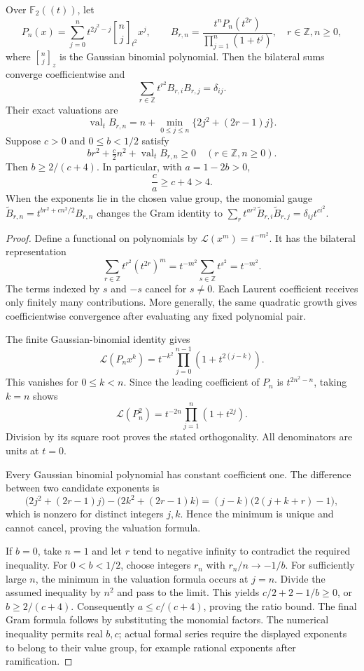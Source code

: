 \begin{proposition}\label{prop:bilateral-kernel}
Over $\mathbb F_2((t))$, let
\[
 P_n(x)=\sum_{j=0}^n t^{2j^2-j}\genfrac{[}{]}{0pt}{}{n}{j}_{t^2}x^j,
 \qquad
 B_{r,n}=\frac{t^nP_n(t^{2r})}{\prod_{j=1}^n(1+t^j)},
 \quad r\in\mathbb Z, n\geq0,
\]
where $\genfrac{[}{]}{0pt}{}{n}{j}_z$ is the Gaussian binomial polynomial. Then the bilateral sums converge coefficientwise and
\[
 \sum_{r\in\mathbb Z}t^{r^2}B_{r,i}B_{r,j}=\delta_{ij}.
\]
Their exact valuations are
\[
 \operatorname{val}_t B_{r,n}
 =n+\min_{0\leq j\leq n}\{2j^2+(2r-1)j\}.
\]
Suppose $c>0$ and $0\leq b<1/2$ satisfy
\[
 br^2+\tfrac c2n^2+\operatorname{val}_t B_{r,n}\geq0
 \quad(r\in\mathbb Z, n\geq0).
\]
Then $b\geq2/(c+4)$. In particular, with $a=1-2b>0$,
\[
 \frac ca\geq c+4>4.
\]
When the exponents lie in the chosen value group, the monomial gauge
$\widetilde B_{r,n}=t^{br^2+cn^2/2}B_{r,n}$
changes the Gram identity to
$\sum_r t^{ar^2}\widetilde B_{r,i}\widetilde B_{r,j}=\delta_{ij}t^{ci^2}$.
\end{proposition}
\begin{proof}
Define a functional on polynomials by $\mathcal L(x^m)=t^{-m^2}$. It has the bilateral representation
\[
 \sum_{r\in\mathbb Z}t^{r^2}(t^{2r})^m
 =t^{-m^2}\sum_{s\in\mathbb Z}t^{s^2}=t^{-m^2}.
\]
The terms indexed by $s$ and $-s$ cancel for $s\ne0$. Each Laurent coefficient receives only finitely many contributions. More generally, the same quadratic growth gives coefficientwise convergence after evaluating any fixed polynomial pair.

The finite Gaussian-binomial identity gives
\[
 \mathcal L(P_nx^k)
 =t^{-k^2}\prod_{j=0}^{n-1}(1+t^{2(j-k)}).
\]
This vanishes for $0\leq k<n$. Since the leading coefficient of $P_n$ is $t^{2n^2-n}$, taking $k=n$ shows
\[
 \mathcal L(P_n^2)=t^{-2n}\prod_{j=1}^n(1+t^{2j}).
\]
Division by its square root proves the stated orthogonality. All denominators are units at $t=0$.

Every Gaussian binomial polynomial has constant coefficient one. The difference between two candidate exponents is
\[
 \bigl(2j^2+(2r-1)j\bigr)
 -\bigl(2k^2+(2r-1)k\bigr)
 =(j-k)\bigl(2(j+k+r)-1\bigr),
\]
which is nonzero for distinct integers $j,k$. Hence the minimum is unique and cannot cancel, proving the valuation formula.

If $b=0$, take $n=1$ and let $r$ tend to negative infinity to contradict the required inequality. For $0<b<1/2$, choose integers $r_n$ with $r_n/n\to-1/b$. For sufficiently large $n$, the minimum in the valuation formula occurs at $j=n$. Divide the assumed inequality by $n^2$ and pass to the limit. This yields
$c/2+2-1/b\geq0$, or $b\geq2/(c+4)$. Consequently $a\leq c/(c+4)$, proving the ratio bound. The final Gram formula follows by substituting the monomial factors. The numerical inequality permits real $b,c$; actual formal series require the displayed exponents to belong to their value group, for example rational exponents after ramification.
\end{proof}

